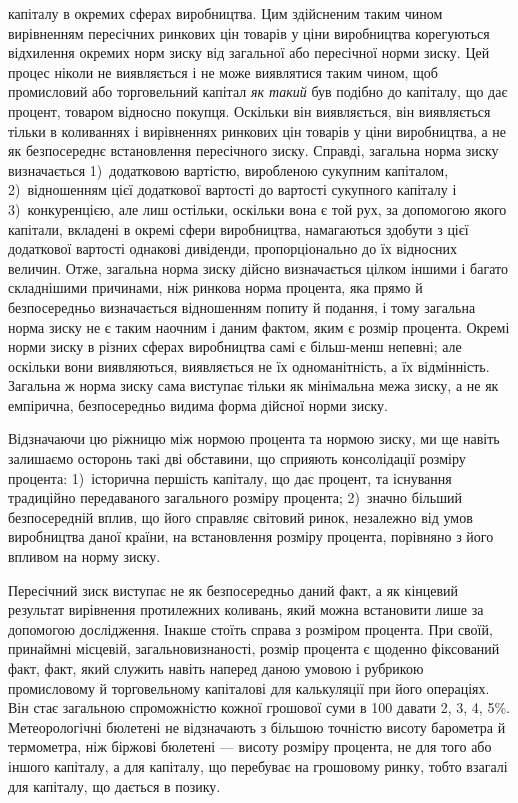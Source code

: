 \parcont{}  %
капіталу в окремих сферах виробництва. Цим здійсненим таким
чином вирівненням пересічних ринкових цін товарів у ціни виробництва
корегуються відхилення окремих норм зиску від загальної
або пересічної норми зиску. Цей процес ніколи не
виявляється і не може виявлятися таким чином, щоб промисловий
або торговельний капітал \emph{як такий} був подібно до капіталу,
що дає процент, товаром відносно покупця. Оскільки він
виявляється, він виявляється тільки в коливаннях і вирівненнях
ринкових цін товарів у ціни виробництва, а не як безпосереднє
встановлення пересічного зиску. Справді, загальна норма зиску
визначається 1)~додатковою вартістю, виробленою сукупним
капіталом, 2)~відношенням цієї додаткової вартості до вартості
сукупного капіталу і 3)~конкуренцією, але лиш остільки,
оскільки вона є той рух, за допомогою якого капітали, вкладені
в окремі сфери виробництва, намагаються здобути з цієї
додаткової вартості однакові дивіденди, пропорціонально до їх
відносних величин. Отже, загальна норма зиску дійсно визначається
цілком іншими і багато складнішими причинами, ніж ринкова
норма процента, яка прямо й безпосередньо визначається
відношенням попиту й подання, і тому загальна норма зиску
не є таким наочним і даним фактом, яким є розмір процента.
Окремі норми зиску в різних сферах виробництва самі є більш-менш
непевні; але оскільки вони виявляються, виявляється не
їх одноманітність, а їх відмінність. Загальна ж норма зиску сама
виступає тільки як мінімальна межа зиску, а не як емпірична,
безпосередньо видима форма дійсної норми зиску.

Відзначаючи цю ріжницю між нормою процента та нормою
зиску, ми ще навіть залишаємо осторонь такі дві обставини, що
сприяють консолідації розміру процента: 1)~історична першість
капіталу, що дає процент, та існування традиційно передаваного
загального розміру процента; 2)~значно більший безпосередній
вплив, що його справляє світовий ринок, незалежно від умов
виробництва даної країни, на встановлення розміру процента, порівняно
з його впливом на норму зиску.

Пересічний зиск виступає не як безпосередньо даний факт,
а як кінцевий результат вирівнення протилежних коливань, який
можна встановити лише за допомогою дослідження. Інакше
стоїть справа з розміром процента. При своїй, принаймні місцевій,
загальновизнаності, розмір процента є щоденно фіксований
факт, факт, який служить навіть наперед даною умовою і рубрикою
промисловому й торговельному капіталові для калькуляції
при його операціях. Він стає загальною спроможністю
кожної грошової суми в 100 давати 2, 3, 4,
5\%. Метеорологічні бюлетені не відзначають з більшою точністю
висоту барометра й термометра, ніж біржові бюлетені —
висоту розміру процента, не для того або іншого капіталу, а для
капіталу, що перебуває на грошовому ринку, тобто взагалі для
капіталу, що дається в позику.
